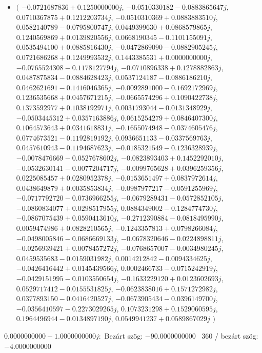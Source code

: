\documentclass[14pt,a4paper]{article}
\begin{document}
\begin{itemize}
\item
$\big($
$-0.0721687836+0.1250000000j$, $-0.0510330182-0.0883865647j$, $0.0710367875+0.1212203734j$, $-0.0510310369+0.0883883510j$, $0.0582140789-0.0795800747j$, $0.0449399630+0.0868579865j$, $0.1240569869+0.0139820556j$, $0.0668190345-0.1101155091j$, $0.0535494100+0.0885816430j$, $-0.0472869090-0.0882905245j$, $0.0721686268+0.1249993532j$, $0.1443385531+0.0000000000j$, $-0.0765524308-0.1178127794j$, $-0.0710896338+0.1278882863j$, $0.0487875834-0.0884628423j$, $0.0537124187-0.0886186210j$, $0.0462621691-0.1416046365j$, $-0.0092891000-0.1692172969j$, $0.1236535668+0.0457671215j$, $-0.0665574296+0.1090422738j$, $0.1373592977+0.1038192971j$, $0.0031793044-0.0131348929j$, $-0.0503445312+0.0357163886j$, $0.0615254279+0.0846407300j$, $0.1064573643+0.0341618831j$, $-0.1655074948-0.0374605476j$, $0.0774673521-0.1192819192j$, $0.0936651133-0.0337569763j$, $0.0457610943-0.1194687623j$, $-0.0185321549-0.1236328939j$, $-0.0078476669-0.0527678602j$, $-0.0823893403+0.1452292010j$, $-0.0532630141-0.0077204717j$, $-0.0099765628+0.0396259356j$, $0.0225085457+0.0280952378j$, $-0.0153651497+0.0837972614j$, $0.0438649879+0.0035853834j$, $-0.0987977217-0.0591255969j$, $-0.0717792720-0.0736966255j$, $-0.0679289431-0.0572852105j$, $-0.0860834077+0.0298517955j$, $0.0884349002-0.1284774730j$, $-0.0867075439+0.0590413610j$, $-0.2712390884-0.0818495990j$, $0.0059474986+0.0828210565j$, $-0.1243357813+0.0798266084j$, $-0.0498005846-0.0686669133j$, $-0.0678320646-0.0224898811j$, $-0.0256939421+0.0078457272j$, $-0.0768657007-0.0034980245j$, $0.0459535683-0.0159031982j$, $0.0014212842-0.0094334625j$, $-0.0426416442+0.0145439566j$, $0.0002466733-0.0715242919j$, $-0.0429151995-0.0103550654j$, $-0.1633229120+0.0123602693j$, $0.0529717412-0.0155531825j$, $-0.0623838016+0.1571272982j$, $0.0377893150-0.0416420527j$, $-0.0673905434-0.0396149700j$, $-0.0356410597-0.2273029265j$, $0.1073231298+0.1529060595j$, $0.1964496944-0.0134897190j$, $0.0549941237+0.0589867029j$
$\big)$
\end{itemize}
$0.0000000000-1.0000000000j$:\
Bezárt szög: $-90.0000000000$ \
360 / bezárt szög: $-4.0000000000$\
\end{document}
